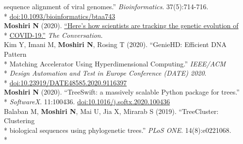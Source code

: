 \documentclass[margin,line]{res}
\begin{document}
\begin{resume}
\hspace*{9mm} sequence alignment of viral genomes.'' \textit{Bioinformatics}. 37(5):714-716.\\*\vspace{2mm}
\hspace*{8mm} \href{https://doi.org/10.1093/bioinformatics/btaa743}{doi:10.1093/bioinformatics/btaa743}\\
\hspace*{4mm} \textbf{Moshiri N} (2020). \href{https://theconversation.com/heres-how-scientists-are-tracking-the-genetic-evolution-of-covid-19-134201}{``Here's how scientists are tracking the genetic evolution of}\\*\vspace{2mm}
\hspace*{8mm} \href{https://theconversation.com/heres-how-scientists-are-tracking-the-genetic-evolution-of-covid-19-134201}{COVID-19.''} \textit{The Conversation}.\\
\hspace*{4mm} Kim Y, Imani M, \textbf{Moshiri N}, Rosing T (2020). ``GenieHD: Efficient DNA Pattern\\*
\hspace*{9mm}  Matching Accelerator Using Hyperdimensional Computing.'' \textit{IEEE/ACM}\\*
\hspace*{9mm} \textit{Design Automation and Test in Europe Conference (DATE) 2020}.\\*\vspace{2mm}
\hspace*{8mm} \href{https://doi.org/10.23919/DATE48585.2020.9116397}{doi:10.23919/DATE48585.2020.9116397}\\
\hspace*{4mm} \textbf{Moshiri N} (2020). ``TreeSwift: a massively scalable Python package for trees.''\\*\vspace{2mm}
\hspace*{8mm} \textit{SoftwareX}. 11:100436. \href{https://doi.org/10.1016/j.softx.2020.100436}{doi:10.1016/j.softx.2020.100436}\\
\hspace*{4mm} Balaban M, \textbf{Moshiri N}, Mai U, Jia X, Mirarab S (2019). ``TreeCluster: Clustering\\*
\hspace*{9mm} biological sequences using phylogenetic trees.'' \textit{PLoS ONE}. 14(8):e0221068.\\*\vspace{2mm}

\end{resume}
\end{document}
